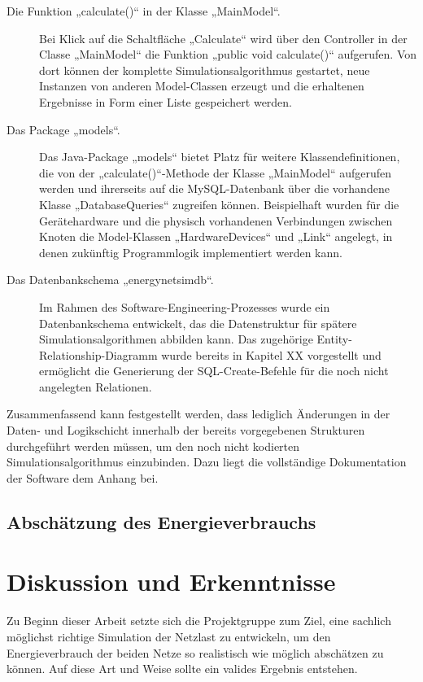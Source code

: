 \documentclass[12pt,titlepage]{article}
\begin{document}
\begin{description}
\item [Die Funktion „calculate()“ in der Klasse „MainModel“.] Bei Klick auf die Schaltfläche „Calculate“ wird über den Controller in der Classe „MainModel“ die Funktion „public void calculate()“ aufgerufen. Von dort können der komplette Simulationsalgorithmus gestartet, neue Instanzen von anderen Model-Classen erzeugt und die erhaltenen Ergebnisse in Form einer Liste gespeichert werden.
\item [Das Package „models“.] Das Java-Package „models“ bietet Platz für weitere Klassendefinitionen, die von der „calculate()“-Methode der Klasse „MainModel“ aufgerufen werden und ihrerseits auf die MySQL-Datenbank über die vorhandene Klasse „DatabaseQueries“ zugreifen können. Beispielhaft wurden für die Gerätehardware und die physisch vorhandenen Verbindungen zwischen Knoten die Model-Klassen „HardwareDevices“ und „Link“ angelegt, in denen zukünftig Programmlogik implementiert werden kann.
\item [Das Datenbankschema „energynetsimdb“.] Im Rahmen des Software-Engineering-Prozesses wurde ein Datenbankschema entwickelt, das die Datenstruktur für spätere Simulationsalgorithmen abbilden kann. Das zugehörige Entity-Relationship-Diagramm wurde bereits in Kapitel XX vorgestellt und ermöglicht die Generierung der SQL-Create-Befehle für die noch nicht angelegten Relationen.
\end{description}

Zusammenfassend kann festgestellt werden, dass lediglich Änderungen in der Daten- und Logikschicht innerhalb der bereits vorgegebenen Strukturen durchgeführt werden müssen, um den noch nicht kodierten Simulationsalgorithmus einzubinden. Dazu liegt die vollständige Dokumentation der Software dem Anhang bei.

\subsection{Abschätzung des Energieverbrauchs} \label{subsec:ErgSch}

\newpage
\section{Diskussion und Erkenntnisse}
Zu Beginn dieser Arbeit setzte sich die Projektgruppe zum Ziel, eine sachlich möglichst richtige Simulation der Netzlast zu entwickeln, um den Energieverbrauch der beiden Netze so realistisch wie möglich abschätzen zu können. Auf diese Art und Weise sollte ein valides Ergebnis entstehen.
\end{document}
